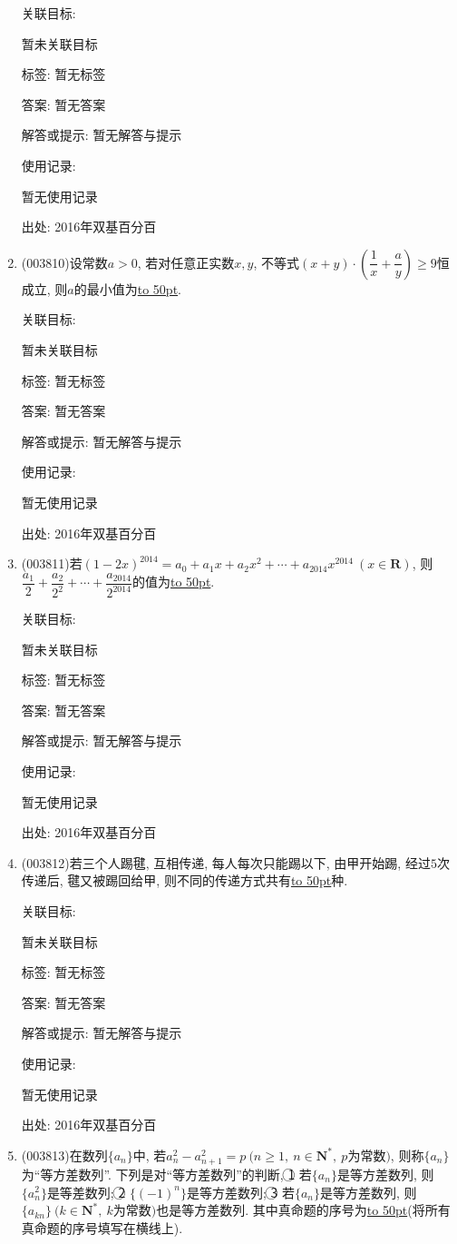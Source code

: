 \documentclass[10pt,a4paper]{article}
\newcommand{\blank}[1]{\underline{\hbox to #1pt{}}}
\begin{document}
\begin{enumerate}[1.]
关联目标:

暂未关联目标



标签: 暂无标签

答案: 暂无答案

解答或提示: 暂无解答与提示

使用记录:

暂无使用记录


出处: 2016年双基百分百
\item { (003810)}设常数$a>0$, 若对任意正实数$x,y$, 不等式$(x+y)\cdot\left(\dfrac 1x+\dfrac ay\right)\ge 9$恒成立, 则$a$的最小值为\blank{50}.


关联目标:

暂未关联目标



标签: 暂无标签

答案: 暂无答案

解答或提示: 暂无解答与提示

使用记录:

暂无使用记录


出处: 2016年双基百分百
\item { (003811)}若$(1-2x)^{2014}=a_0+a_1x+a_2x^2+\cdots+a_{2014}x^{2014} \ (x\in \mathbf{R})$, 则$\dfrac{a_1}{2}+\dfrac{a_2}{2^2}+\cdots+\dfrac{a_{2014}}{2^{2014}}$的值为\blank{50}.


关联目标:

暂未关联目标



标签: 暂无标签

答案: 暂无答案

解答或提示: 暂无解答与提示

使用记录:

暂无使用记录


出处: 2016年双基百分百
\item { (003812)}若三个人踢毽, 互相传递, 每人每次只能踢以下, 由甲开始踢, 经过$5$次传递后, 毽又被踢回给甲, 则不同的传递方式共有\blank{50}种.


关联目标:

暂未关联目标



标签: 暂无标签

答案: 暂无答案

解答或提示: 暂无解答与提示

使用记录:

暂无使用记录


出处: 2016年双基百分百
\item { (003813)}在数列$\{a_n\}$中, 若$a_n^2-a_{n+1}^2=p\ (n\ge 1, \ n\in\mathbf{N}^*, \ p$为常数$)$, 则称$\{a_n\}$为``等方差数列''. 下列是对``等方差数列''的判断,
\textcircled{1} 若$\{a_n\}$是等方差数列, 则$\{a_n^2\}$是等差数列;
\textcircled{2} $\{(-1)^n\}$是等方差数列;
\textcircled{3} 若$\{a_n\}$是等方差数列, 则$\{a_{kn}\} \ (k\in \mathbf{N}^*, \ k$为常数$)$也是等方差数列.
其中真命题的序号为\blank{50}(将所有真命题的序号填写在横线上).



\end{enumerate}
\end{document}
